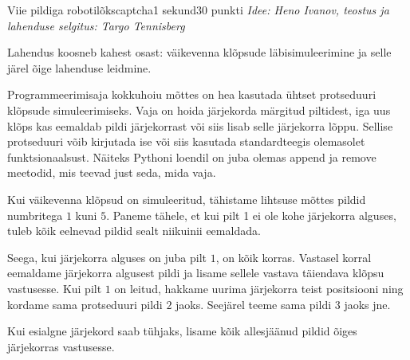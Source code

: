 \begin{yl}{2}{Viie pildiga robotilõks}{captcha}{1 sekund}{30 punkti}
  \emph{Idee: Heno Ivanov, teostus ja lahenduse selgitus: Targo Tennisberg}

Lahendus koosneb kahest osast: väikevenna klõpsude läbisimuleerimine ja selle järel õige lahenduse leidmine. 

Programmeerimisaja kokkuhoiu mõttes on hea kasutada ühtset protseduuri klõpsude simuleerimiseks.
Vaja on hoida järjekorda märgitud piltidest, iga uus klõps kas eemaldab pildi järjekorrast või siis lisab selle järjekorra lõppu. 
Sellise protseduuri võib kirjutada ise või siis kasutada standardteegis olemasolet funktsionaalsust. 
Näiteks Pythoni loendil on juba olemas append ja remove meetodid, mis teevad just seda, mida vaja.

Kui väikevenna klõpsud on simuleeritud, tähistame lihtsuse mõttes pildid numbritega $1$ kuni $5$. 
Paneme tähele, et kui  pilt 1 ei ole kohe järjekorra alguses, tuleb kõik eelnevad pildid sealt niikuinii eemaldada.

Seega, kui järjekorra alguses on juba pilt $1$, on kõik korras. Vastasel korral eemaldame järjekorra algusest pildi ja lisame sellele vastava täiendava klõpsu vastusesse.
Kui pilt $1$ on leitud, hakkame uurima järjekorra teist positsiooni ning kordame sama protseduuri pildi $2$ jaoks. Seejärel teeme sama pildi $3$ jaoks jne.

Kui esialgne järjekord saab tühjaks, lisame kõik allesjäänud pildid õiges järjekorras vastusesse.
\end{yl}
